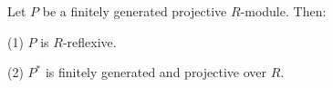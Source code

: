 Let $P$ be a finitely generated projective $R$-module. Then:

(1) $P$ is $R$-reflexive.

(2) $P^*$ is finitely generated and projective over $R$.
